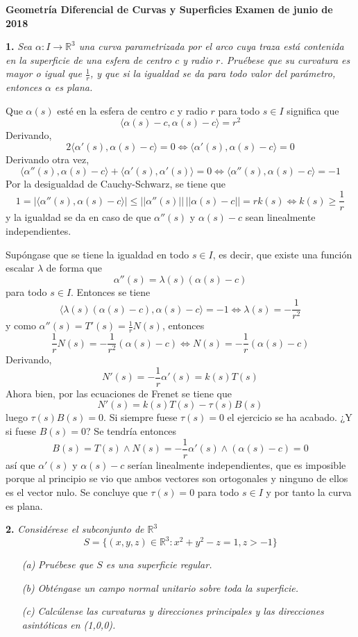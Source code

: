 \documentclass[12pt]{report}
\newcommand{\R}{\mathbb R}
\begin{document}
\small

\textbf{Geometría Diferencial de Curvas y Superficies} \hfill \textbf{Examen de junio de 2018}
\linebreak

\textbf{1.} \textit{Sea $\alpha \colon I \to \R^3$ una curva parametrizada por el arco cuya traza está contenida en la superficie de una esfera de centro $c$ y radio $r$. Pruébese que su curvatura es mayor o igual que $\frac{1}{r}$, y que si la igualdad se da para todo valor del parámetro, entonces $\alpha$ es plana.}

\vspace{2mm}
Que $\alpha(s)$ esté en la esfera de centro $c$ y radio $r$ para todo $s \in I$ significa que
\[\langle \alpha(s)-c,\alpha(s)-c \rangle = r^2\]
Derivando,
\[2\langle \alpha'(s),\alpha(s)-c \rangle = 0 \iff \langle \alpha'(s),\alpha(s)-c \rangle = 0\]
Derivando otra vez,
\[\langle \alpha''(s),\alpha(s)-c \rangle +\langle \alpha'(s),\alpha'(s) \rangle = 0 \iff \langle \alpha''(s),\alpha(s)-c \rangle = -1\]
Por la desigualdad de Cauchy-Schwarz, se tiene que
\[1 = |\langle \alpha''(s),\alpha(s)-c \rangle | \leq ||\alpha''(s)|| \, ||\alpha(s)-c|| = r k(s) \iff k(s) \geq \frac{1}{r}\]
y la igualdad se da en caso de que $\alpha''(s)$ y $\alpha(s)-c$ sean linealmente independientes. 

\vspace{2mm}
Supóngase que se tiene la igualdad en todo $s \in I$, es decir, que existe una función escalar $\lambda$ de forma que
\[\alpha''(s) = \lambda(s)(\alpha(s)-c)\]
para todo $s \in I$. Entonces se tiene
\[\langle \lambda(s)(\alpha(s)-c),\alpha(s)-c \rangle = -1 \iff \lambda(s) = -\frac{1}{r^2}\]
y como $\alpha''(s) = T'(s) = \frac{1}{r}N(s)$, entonces
\[\frac{1}{r}N(s) = -\frac{1}{r^2}(\alpha(s)-c) \iff N(s)=-\frac{1}{r}(\alpha(s)-c)\]
Derivando,
\[N'(s) = -\frac{1}{r}\alpha'(s) = k(s)T(s)\]
Ahora bien, por las ecuaciones de Frenet se tiene que
\[N'(s) = k(s)T(s)-\tau(s)B(s)\]
luego $\tau(s)B(s) = 0$. Si siempre fuese $\tau(s) = 0$ el ejercicio se ha acabado. ¿Y si fuese $B(s)=0$? Se tendría entonces
\[B(s) = T(s) \wedge N(s) = -\frac{1}{r}\alpha'(s) \wedge (\alpha(s)-c) = 0\]
así que $\alpha'(s)$ y $\alpha(s)-c$ serían linealmente independientes, que es imposible porque al principio se vio que ambos vectores son ortogonales y ninguno de ellos es el vector nulo. Se concluye que $\tau(s) = 0$ para todo $s \in I$ y por tanto la curva es plana.

\pagebreak

\vspace{4mm}
\textbf{2.} \textit{Considérese el subconjunto de $\R^3$
\[S = \{(x,y,z) \in \R^3 \colon x^2+y^2-z=1, z > -1\}\]}
\begin{itemize}
    \item[\textit{(a)}] \textit{Pruébese que $S$ es una superficie regular.}
    \item[\textit{(b)}] \textit{Obténgase un campo normal unitario sobre toda la superficie.}
    \item[\textit{(c)}] \textit{Calcúlense las curvaturas y direcciones principales y las direcciones asintóticas en (1,0,0).}
\end{itemize}
\end{document}

